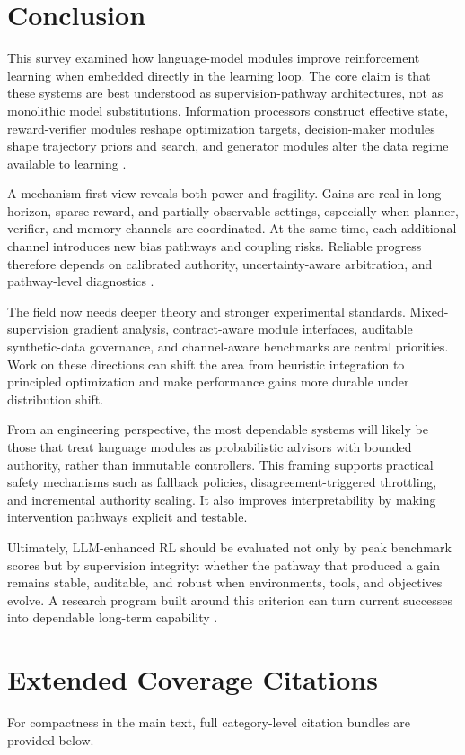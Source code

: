 \documentclass[pdflatex,sn-mathphys-num]{sn-jnl}
\begin{document}
\section{Conclusion}
This survey examined how language-model modules improve reinforcement learning when embedded directly in the learning loop. The core claim is that these systems are best understood as supervision-pathway architectures, not as monolithic model substitutions. Information processors construct effective state, reward-verifier modules reshape optimization targets, decision-maker modules shape trajectory priors and search, and generator modules alter the data regime available to learning \cite{arxiv_p_2204_01691,arxiv_p_2310_12931,arxiv_p_2404_03648,arxiv_p_2602_02454,arxiv_p_2602_07848}.

A mechanism-first view reveals both power and fragility. Gains are real in long-horizon, sparse-reward, and partially observable settings, especially when planner, verifier, and memory channels are coordinated. At the same time, each additional channel introduces new bias pathways and coupling risks. Reliable progress therefore depends on calibrated authority, uncertainty-aware arbitration, and pathway-level diagnostics \cite{arxiv_p_2602_06493,arxiv_p_2602_12579,arxiv_p_2602_00994,arxiv_p_2602_14468}.

The field now needs deeper theory and stronger experimental standards. Mixed-supervision gradient analysis, contract-aware module interfaces, auditable synthetic-data governance, and channel-aware benchmarks are central priorities. Work on these directions can shift the area from heuristic integration to principled optimization and make performance gains more durable under distribution shift.

From an engineering perspective, the most dependable systems will likely be those that treat language modules as probabilistic advisors with bounded authority, rather than immutable controllers. This framing supports practical safety mechanisms such as fallback policies, disagreement-triggered throttling, and incremental authority scaling. It also improves interpretability by making intervention pathways explicit and testable.

Ultimately, LLM-enhanced RL should be evaluated not only by peak benchmark scores but by supervision integrity: whether the pathway that produced a gain remains stable, auditable, and robust when environments, tools, and objectives evolve. A research program built around this criterion can turn current successes into dependable long-term capability \cite{arxiv_p_2512_05686,arxiv_p_2602_09367,arxiv_p_2602_13156}.

\appendix
\section{Extended Coverage Citations}
For compactness in the main text, full category-level citation bundles are provided below.



\end{document}
